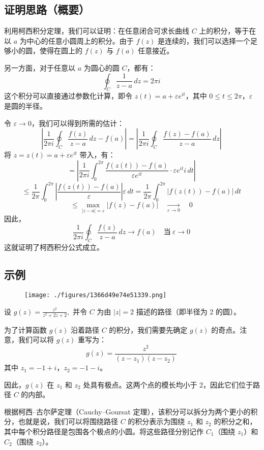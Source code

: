 \subsection{证明思路（概要）}
利用柯西积分定理，我们可以证明：在任意闭合可求长曲线 $C$ 上的积分，等于在以 $a$ 为中心的任意小圆周上的积分。由于 $f(z)$ 是连续的，我们可以选择一个足够小的圆，使得在圆上的 $f(z)$ 与 $f(a)$ 任意接近。

另一方面，对于任意以 $a$ 为圆心的圆 $C$，都有：
$$
\oint_{C} \frac{1}{z - a} \, dz = 2\pi i~
$$
这个积分可以直接通过参数化计算，即令 $z(t) = a + \varepsilon e^{it}$，其中 $0 \leq t \leq 2\pi$，$\varepsilon$ 是圆的半径。

令 $\varepsilon \to 0$，我们可以得到所需的估计：
$$
\left| \frac{1}{2\pi i} \oint_{C} \frac{f(z)}{z - a} \, dz - f(a) \right|
= \left| \frac{1}{2\pi i} \oint_{C} \frac{f(z) - f(a)}{z - a} \, dz \right|~
$$
将 $z = z(t) = a + \varepsilon e^{it}$ 带入，有：
$$
= \left| \frac{1}{2\pi i} \int_0^{2\pi} \frac{f(z(t)) - f(a)}{\varepsilon e^{it}} \cdot \varepsilon e^{it} i \, dt \right|~
$$
$$
\leq \frac{1}{2\pi} \int_0^{2\pi} \left| \frac{f(z(t)) - f(a)}{\varepsilon} \right| \varepsilon \, dt
= \frac{1}{2\pi} \int_0^{2\pi} |f(z(t)) - f(a)| \, dt~
$$
$$
\leq \max_{|z - a| = \varepsilon} |f(z) - f(a)| \quad \xrightarrow[\varepsilon \to 0]{} \quad 0~
$$
因此，
$$
\frac{1}{2\pi i} \oint_{C} \frac{f(z)}{z - a} \, dz \to f(a) \quad \text{当}~ \varepsilon \to 0~
$$
这就证明了柯西积分公式成立。
\subsection{示例}
\begin{figure}[ht]
\centering
\texttt{[image: ./figures/1366d49e74e51339.png]}
\caption{} \label{fig_KXjfgs_1}
\end{figure}
设
$g(z) = \frac{z^2}{z^2 + 2z + 2},$
并令 $C$ 为由 $|z| = 2$ 描述的路径（即半径为 2 的圆）。

为了计算函数 $g(z)$ 沿着路径 $C$ 的积分，我们需要先确定 $g(z)$ 的奇点。注意，我们可以将 $g(z)$ 重写为：
$$
g(z) = \frac{z^2}{(z - z_1)(z - z_2)}~
$$
其中 $z_1 = -1 + i$，$z_2 = -1 - i$。

因此，$g(z)$ 在 $z_1$ 和 $z_2$ 处具有极点。这两个点的模长均小于 2，因此它们位于路径 $C$ 的内部。

根据柯西–古尔萨定理（Cauchy–Goursat 定理），该积分可以拆分为两个更小的积分，也就是说，我们可以将围绕路径 $C$ 的积分表示为围绕 $z_1$ 和 $z_2$ 的积分之和，其中每个积分路径是包围各个极点的小圆。将这些路径分别记作 $C_1$（围绕 $z_1$）和 $C_2$（围绕 $z_2$）。
